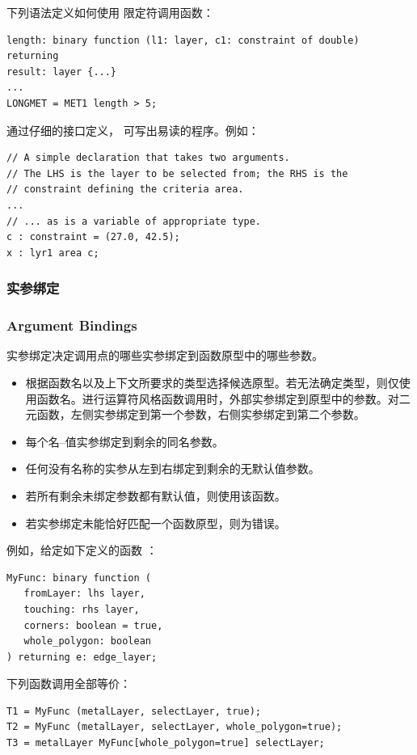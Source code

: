 下列语法定义如何使用  限定符调用函数：
\begin{lstlisting}[style=pxl]
length: binary function (l1: layer, c1: constraint of double) returning
result: layer {...}
...
LONGMET = MET1 length > 5;
\end{lstlisting}

通过仔细的接口定义， 可写出易读的程序。例如：
\begin{lstlisting}[style=pxl]
// A simple declaration that takes two arguments.
// The LHS is the layer to be selected from; the RHS is the
// constraint defining the criteria area.
...
// ... as is a variable of appropriate type.
c : constraint = (27.0, 42.5);
x : lyr1 area c;
\end{lstlisting}

\subsubsection{实参绑定}
\subsubsection*{Argument Bindings}

实参绑定决定调用点的哪些实参绑定到函数原型中的哪些参数。
\begin{itemize}
  \item 根据函数名以及上下文所要求的类型选择候选原型。若无法确定类型，则仅使用函数名。进行运算符风格函数调用时，外部实参绑定到原型中的参数。对二元函数，左侧实参绑定到第一个参数，右侧实参绑定到第二个参数。
  \item 每个名--值实参绑定到剩余的同名参数。
  \item 任何没有名称的实参从左到右绑定到剩余的无默认值参数。
  \item 若所有剩余未绑定参数都有默认值，则使用该函数。
  \item 若实参绑定未能恰好匹配一个函数原型，则为错误。
\end{itemize}

例如，给定如下定义的函数 ：
\begin{lstlisting}[style=pxl]
MyFunc: binary function (
   fromLayer: lhs layer,
   touching: rhs layer,
   corners: boolean = true,
   whole_polygon: boolean
) returning e: edge_layer;
\end{lstlisting}

下列函数调用全部等价：
\begin{lstlisting}[style=pxl]
T1 = MyFunc (metalLayer, selectLayer, true);
T2 = MyFunc (metalLayer, selectLayer, whole_polygon=true);
T3 = metalLayer MyFunc[whole_polygon=true] selectLayer;
\end{lstlisting}

